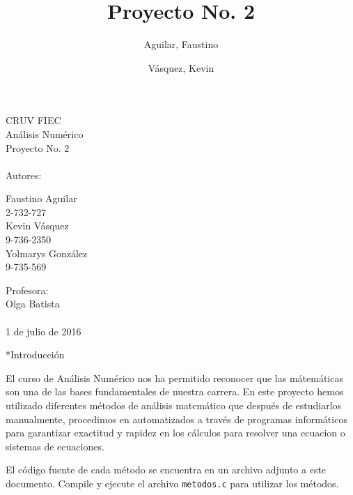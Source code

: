 \documentclass[legalpaper, 12pt]{article}
\title{Proyecto No. 2}
\author{Aguilar, Faustino \and Vásquez, Kevin}
\begin{document}
  \begin{titlepage}
    \centering
    \Large
    CRUV FIEC\\
    Análisis Numérico\\
    Proyecto No. 2\\
    \large
    \hfill\\
    Autores:
    \begin{multicols}{3}
      Faustino Aguilar\\
      2-732-727\\
      \columnbreak
      Kevin Vásquez\\
      9-736-2350\\
      \columnbreak
      Yolmarys González\\
      9-735-569\\
    \end{multicols}
    Profesora:\\
    Olga Batista\\
    \hfill\\
    1 de julio de 2016
  \end{titlepage}
  \newpage
  \tableofcontents
  \setcounter{page}{0}
  \newpage
  \begin{section}*{Introducción}
    El curso de Análisis Numérico nos ha permitido reconocer que las mátemáticas son una de las bases fundamentales de nuestra carrera. En este proyecto hemos utilizado diferentes métodos de análisis matemático que después de estudiarlos manualmente, procedimos en automatizados a través de programas informáticos para garantizar exactitud y rapidez en los cálculos para resolver una ecuacion o sistemas de ecuaciones.

    El código fuente de cada método se encuentra en un archivo adjunto a este documento. Compile y ejecute el archivo \texttt{metodos.c} para utilizar los métodos.
  \end{section}
  \newpage
\end{document}
